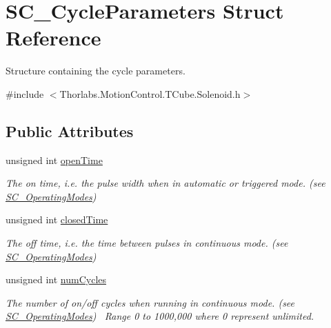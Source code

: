 \hypertarget{struct_s_c___cycle_parameters}{}\section{S\+C\+\_\+\+Cycle\+Parameters Struct Reference}
\label{struct_s_c___cycle_parameters}


Structure containing the cycle parameters.  




{\ttfamily \#include $<$Thorlabs.\+Motion\+Control.\+T\+Cube.\+Solenoid.\+h$>$}

\subsection*{Public Attributes}
\begin{DoxyCompactItemize}
\item 
unsigned int \hyperlink{struct_s_c___cycle_parameters_a1a6ce4376230caffb1828a855568f672}{open\+Time}
\begin{DoxyCompactList}\small\item\em The on time, i.\+e. the pulse width when in automatic or triggered mode. (see \hyperlink{group___t_cube_solenoid_ga02b53b0f5b45f74b6b2da24cc6ff2895}{S\+C\+\_\+\+Operating\+Modes}) ~\newline
 \end{DoxyCompactList}\item 
unsigned int \hyperlink{struct_s_c___cycle_parameters_a871bacab41e33d3c5979a000021c0bcb}{closed\+Time}
\begin{DoxyCompactList}\small\item\em The off time, i.\+e. the time between pulses in continuous mode. (see \hyperlink{group___t_cube_solenoid_ga02b53b0f5b45f74b6b2da24cc6ff2895}{S\+C\+\_\+\+Operating\+Modes})~\newline
 \end{DoxyCompactList}\item 
unsigned int \hyperlink{struct_s_c___cycle_parameters_a829e4ed3529bfe6ae3dc88098386a387}{num\+Cycles}
\begin{DoxyCompactList}\small\item\em The number of on/off cycles when running in continuous mode. (see \hyperlink{group___t_cube_solenoid_ga02b53b0f5b45f74b6b2da24cc6ff2895}{S\+C\+\_\+\+Operating\+Modes})~\newline
 Range 0 to 1000,000 where 0 represent unlimited. \end{DoxyCompactList}\end{DoxyCompactItemize}


